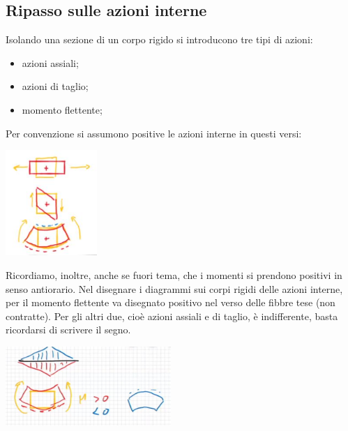\subsection{Ripasso sulle azioni interne}
Isolando una sezione di un corpo rigido si introducono tre tipi di azioni:
\begin{itemize}
    \item azioni assiali;
    \item azioni di taglio;
    \item momento flettente;
\end{itemize}
Per convenzione si assumono positive le azioni interne in questi versi:
\begin{center}
    \includegraphics[height=4cm]{../esercitazione5/img1.JPG}
\end{center}
Ricordiamo, inoltre, anche se fuori tema, che i momenti si prendono positivi in senso antiorario.
\newline
\newline
Nel disegnare i diagrammi sui corpi rigidi delle azioni interne, per il momento flettente va disegnato positivo nel verso delle fibbre tese (non contratte). Per gli altri due, cioè azioni assiali e di taglio, è indifferente, basta ricordarsi di scrivere il segno.
\begin{center}
    \includegraphics[height=3cm]{../esercitazione5/img2.JPG}
\end{center}